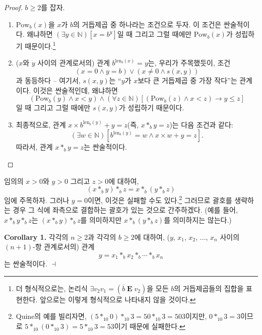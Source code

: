 \documentclass[12pt]{paper}
\newenvironment{context}[1][]{\noindent \textbf{{#1}.}}{\hfill $ \dashv $}
\begin{document}
  \begin{proof}
    $b \geq 2$를 잡자.
    \begin{enumerate}
      \item $\mathrm{Pow}_{b} \left( x \right)$을 $x$가 $b$의 거듭제곱 중 하나라는 조건으로 두자.
      이 조건은 싼술적이다. 왜냐하면 $\left( \exists y \in \mathbb{N} \right) \left[ x = b^{y} \right]$일 때 그리고 그럴 때에만 $\mathrm{Pow}_{b} \left( x \right)$가 성립하기 때문이다.\footnote
      {
        더 형식적으로는, 논리식 $\exists v_2 v_1 = \left( \overline{b} \mathop{\mathbf{E}} v_2 \right)$을 모든 $b$의 거듭제곱들의 집합을 표현한다.
        앞으로는 이렇게 형식적으로 나타내지 않을 것이다.
      }
      \item ($x$와 $y$ 사이의 관계로서의) 관계 $b^{\mathrm{len}_{b} \left( x \right)} = y$는,
      우리가 주목했듯이, 조건 $$ \left( x = 0 \land y = b \right) \lor \left( x \neq 0 \land s \left( x , y \right) \right) $$과 동등하다 --
      여기서, $s \left( x , y \right)$는 ``$y$가 $x$보다 큰 거듭제곱 중 가장 작다''는 관계이다.
      이것은 싼술적인데, 왜냐하면 $$\left( \mathrm{Pow}_{b} \left( y \right) \land x < y \right) \land \left( \forall z \in \mathbb{N} \right) \left[ \left( \mathrm{Pow}_{b} \left( z \right) \land x < z \right) \rightarrow y \leq z \right]$$일 때 그리고 그럴 때에만 $s \left( x , y \right)$가 성립하기 때문이다.
      \item 최종적으로, 관계 $x \times b^{\mathrm{len}_{b} \left( y \right)} + y = z$(즉, $x *_{b} y = z$)는 다음 조건과 같다:
      $$ \left( \exists w \in \mathbb{N} \right) \left[ b^{\mathrm{len}_{b} \left( y \right)} = w \land x \times w + y = z \right] . $$
      따라서, 관계 $x *_{b} y = z$는 싼술적이다.
    \end{enumerate}
  \end{proof}

  임의의 $x > 0$와 $y > 0$ 그리고 $z > 0$에 대하여, $$ \left( x *_{b} y \right) *_{b} z = x *_{b} \left( y *_{b} z \right) $$임에 주목하자.
  그러나 $y = 0$이면, 이것은 실패할 수도 있다.\footnote
  {
    Quine의 예를 빌리자면, $\left( 5 *_{10} 0 \right) *_{10} 3 = 50 *_{10} 3 = 503$이지만,
    $0 *_{10} 3 = 3$이므로 $5 *_{10} \left( 0 *_{10} 3 \right) = 5 *_{10} 3 = 53$이기 때문에 실패한다.
  }
  그러므로 괄호를 생략하는 경우 그 식에 좌측으로 결합하는 괄호가 있는 것으로 간주하겠다.
  (예를 들어, $x *_{b} y *_{b} z$는 $\left( x *_{b} y \right) *_b z$를 의미하지만 $x *_{b} \left( y *_{b} z \right)$를 의미하지는 않는다.)

  \begin{context}[Corollary 1]
    각각의 $n \geq 2$과 각각의 $b \geq 2$에 대하여, ($y$, $x_1$, $x_2$, ..., $x_n$ 사이의 $\left( n + 1 \right)$-항 관계로서의) 관계 $$ y = x_1 *_b x_2 *_b \cdots *_b x_n $$는 싼술적이다.
  \end{context}
\end{document}

